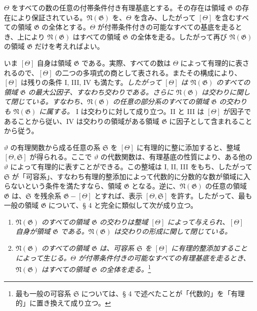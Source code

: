 $\Theta$ をすべての数の任意の付帯条件付き有理基底とする。その存在は領域 $\mathfrak G$ の存在により保証されている。$\mathfrak N(\mathfrak G)$ を、$\Theta$ を含み、したがって $[\Theta]$ を含むすべての領域 $\mathfrak G$ の全体とする。$\Theta$ が付帯条件付きの可能なすべての基底を走るとき、上により $\mathfrak N(\mathfrak G)$ はすべての領域 $\mathfrak G$ の全体を走る。したがって再び $\mathfrak N(\mathfrak G)$ の領域 $\mathfrak G$ だけを考えればよい。

いま $[\Theta]$ 自身は領域 $\mathfrak G$ である。実際、すべての数は $\Theta$ によって有理的に表されるので、$[\Theta]$ の二つの多項式の商として表される。またその構成により、$[\Theta]$ は残りの条件 I, III, IV も満たす。\emph{したがって $[\Theta]$ は $\mathfrak N(\mathfrak G)$ のすべての領域 $\mathfrak G$ の最大公因子、すなわち交わりである。さらに $\mathfrak N(\mathfrak G)$ は交わりに関して閉じている。すなわち、$\mathfrak N(\mathfrak G)$ の任意の部分系のすべての領域 $\mathfrak G$ の交わりも $\mathfrak N(\mathfrak G)$ に属する。} I は交わりに対して成り立つ。II と III は $[\Theta]$ が因子であることから従い、IV は交わりの領域がある領域 $\mathfrak G$ に因子として含まれることから従う。

$\vartheta$ の有理関数から成る任意の系 $\mathfrak S$ を $[\Theta]$ に有理的に整に添加すると、整域 $[\Theta,\mathfrak S]$ が得られる。ここで $\vartheta$ の代数関数は、有理基底の性質により、ある他の $\vartheta$ によって有理的に表すことができる。この整域は I, II, III をもち、したがって $\mathfrak S$ が「可容系」、すなわち有理的整添加によって代数的に分数的な数が領域に入らないという条件を満たすなら、領域 $\mathfrak G$ となる。逆に、$\mathfrak N(\mathfrak G)$ の任意の領域 $\mathfrak G$ は、$\mathfrak S$ を残余系 $\mathfrak G-[\Theta]$ とすれば、表示 $[\Theta,\mathfrak S]$ を許す。したがって、最も一般の領域 $\mathfrak G$ について、§ 4 と完全に類似して次が成り立つ。
\begin{enumerate}
\item[a)] \emph{$\mathfrak N(\mathfrak G)$ のすべての領域 $\mathfrak G$ の交わりは整域 $[\Theta]$ によって与えられ、$[\Theta]$ 自身が領域 $\mathfrak G$ である。$\mathfrak N(\mathfrak G)$ は交わりの形成に関して閉じている。}
\item[b)] \emph{$\mathfrak N(\mathfrak G)$ のすべての領域 $\mathfrak G$ は、可容系 $\mathfrak S$ を $[\Theta]$ に有理的整添加することによって生じる。$\Theta$ が付帯条件付きの可能なすべての有理基底を走るとき、$\mathfrak N(\mathfrak G)$ はすべての領域 $\mathfrak G$ の全体を走る。}\footnote{最も一般の可容系 $\mathfrak S$ については、§ 4 で述べたことが「代数的」を「有理的」に置き換えて成り立つ。}
\end{enumerate}

